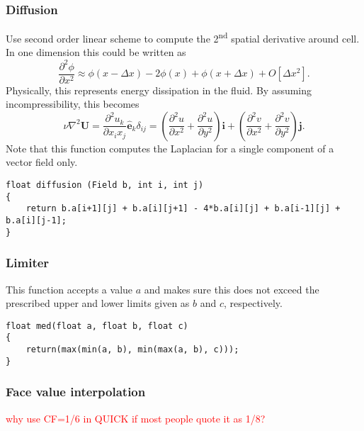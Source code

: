 \documentclass[notitlepage]{article}
\begin{document}
\subsubsection{Diffusion}

Use second order linear scheme to compute the 2\textsuperscript{nd} spatial derivative around cell.
In one dimension this could be written as
%
\begin{equation}
\frac{\partial^2 \phi}{\partial x^2} \approx \phi(x-\Delta x) -2 \phi(x) + \phi(x + \Delta x) + O[\Delta x^2] .
\end{equation}
%
Physically, this represents energy dissipation in the fluid. By assuming incompressibility, this
becomes
%
\begin{equation}
\nu \nabla^2 \mathbf{U} = \frac{\partial^2 u_k}{\partial x_i x_j} \mathbf{\hat{e}}_k \delta_{ij} = 
	\left( \frac{\partial^2 u}{\partial x^2} + \frac{\partial^2 u}{\partial y^2} \right) \mathbf{i}
	+\left( \frac{\partial^2 v}{\partial x^2} + \frac{\partial^2 v}{\partial y^2} \right) \mathbf{j} .
\end{equation}
%
Note that this function computes the Laplacian for a single component of a vector field only.

\begin{lstlisting}[style=myCpp]
float diffusion (Field b, int i, int j)
{
	return b.a[i+1][j] + b.a[i][j+1] - 4*b.a[i][j] + b.a[i-1][j] + b.a[i][j-1];
}
\end{lstlisting}

\subsubsection{Limiter}

This function accepts a value $a$ and makes sure this does not exceed the prescribed
upper and lower limits given as $b$ and $c$, respectively.

\begin{lstlisting}[style=myCpp]
float med(float a, float b, float c)
{
	return(max(min(a, b), min(max(a, b), c)));
}
\end{lstlisting}

\subsubsection{Face value interpolation}

\textcolor{red}{why use CF=1/6 in QUICK if most people quote it as 1/8?}
\end{document}
